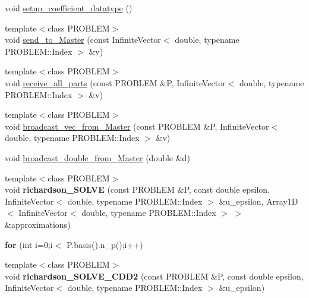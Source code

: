 \begin{CompactItemize}
\item 
void \hyperlink{namespaceFrameTL_010a7b97f26561b6923f285c1cbb8d02}{setup\_\-coefficient\_\-datatype} ()
\item 
{\footnotesize template$<$class PROBLEM$>$ }\\void \hyperlink{namespaceFrameTL_868f995657a7f68345fe24340658282e}{send\_\-to\_\-Master} (const InfiniteVector$<$ double, typename PROBLEM::Index $>$ \&v)
\item 
{\footnotesize template$<$class PROBLEM$>$ }\\void \hyperlink{namespaceFrameTL_3ea47092508598512ecc54955117a16f}{receive\_\-all\_\-parts} (const PROBLEM \&P, InfiniteVector$<$ double, typename PROBLEM::Index $>$ \&v)
\item 
{\footnotesize template$<$class PROBLEM$>$ }\\void \hyperlink{namespaceFrameTL_99afa22a98a5b20d8326b2983bb19088}{broadcast\_\-vec\_\-from\_\-Master} (const PROBLEM \&P, InfiniteVector$<$ double, typename PROBLEM::Index $>$ \&v)
\item 
void \hyperlink{namespaceFrameTL_5b01ba18f76ca06fb77d8cbca90492e8}{broadcast\_\-double\_\-from\_\-Master} (double \&d)
\item 
\hypertarget{namespaceFrameTL_bacf8c8fd02179e596a29355d939ec7c}{
{\footnotesize template$<$class PROBLEM$>$ }\\void \textbf{richardson\_\-SOLVE} (const PROBLEM \&P, const double epsilon, InfiniteVector$<$ double, typename PROBLEM::Index $>$ \&u\_\-epsilon, Array1D$<$ InfiniteVector$<$ double, typename PROBLEM::Index $>$ $>$ \&approximations)}
\label{namespaceFrameTL_bacf8c8fd02179e596a29355d939ec7c}

\item 
\hypertarget{namespaceFrameTL_1111c8e69e372f889361af29dad3c8dd}{
\textbf{for} (int i=0;i$<$ P.basis().n\_\-p();i++)}
\label{namespaceFrameTL_1111c8e69e372f889361af29dad3c8dd}

\item 
\hypertarget{namespaceFrameTL_1a05babec2a9b0c713764d9ba15e2048}{
{\footnotesize template$<$class PROBLEM$>$ }\\void \textbf{richardson\_\-SOLVE\_\-CDD2} (const PROBLEM \&P, const double epsilon, InfiniteVector$<$ double, typename PROBLEM::Index $>$ \&u\_\-epsilon)}
\label{namespaceFrameTL_1a05babec2a9b0c713764d9ba15e2048}


\end{CompactItemize}
